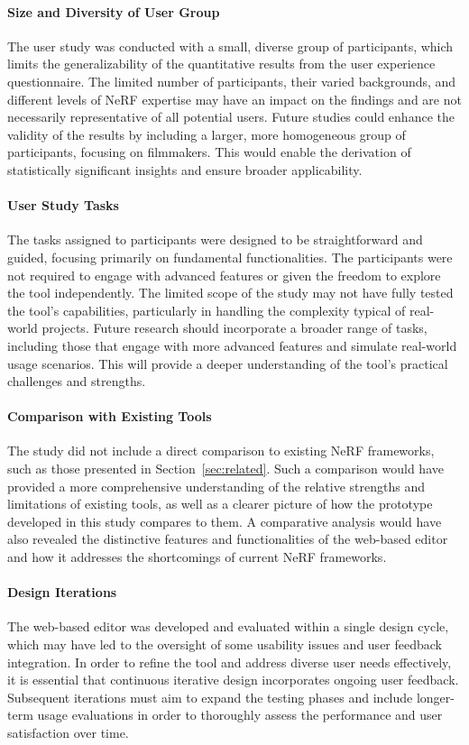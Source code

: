 \paragraph{Size and Diversity of User Group}
The user study was conducted with a small, diverse group of participants, which limits the generalizability of the quantitative results from the user experience questionnaire.
The limited number of participants, their varied backgrounds, and different levels of NeRF expertise may have an impact on the findings and are not necessarily representative of all potential users.
Future studies could enhance the validity of the results by including a larger, more homogeneous group of participants, focusing on filmmakers. This would enable the derivation of statistically significant insights and ensure broader applicability.

\paragraph{User Study Tasks}
The tasks assigned to participants were designed to be straightforward and guided, focusing primarily on fundamental functionalities.
The participants were not required to engage with advanced features or given the freedom to explore the tool independently.
The limited scope of the study may not have fully tested the tool's capabilities, particularly in handling the complexity typical of real-world projects.
Future research should incorporate a broader range of tasks, including those that engage with more advanced features and simulate real-world usage scenarios. This will provide a deeper understanding of the tool’s practical challenges and strengths.

\paragraph{Comparison with Existing Tools}
The study did not include a direct comparison to existing NeRF frameworks, such as those presented in Section~\ref{sec:related}.
Such a comparison would have provided a more comprehensive understanding of the relative strengths and limitations of existing tools, as well as a clearer picture of how the prototype developed in this study compares to them.
A comparative analysis would have also revealed the distinctive features and functionalities of the web-based editor and how it addresses the shortcomings of current NeRF frameworks.

\paragraph{Design Iterations}
The web-based editor was developed and evaluated within a single design cycle, which may have led to the oversight of some usability issues and user feedback integration.
In order to refine the tool and address diverse user needs effectively, it is essential that continuous iterative design incorporates ongoing user feedback.
Subsequent iterations must aim to expand the testing phases and include longer-term usage evaluations in order to thoroughly assess the performance and user satisfaction over time.

